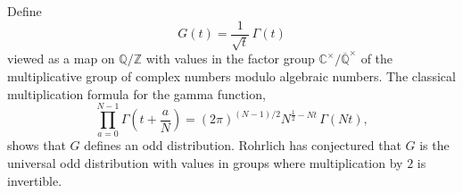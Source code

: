 Define
$$
G(t) = \frac{1}{\sqrt{t}} \, \Gamma(t)
$$
viewed as a map on $\mathbb{Q}/\mathbb{Z}$ with values in the factor group $\mathbb{C}^\times / \overline{\mathbb{Q}}^\times$ of the multiplicative group of complex numbers modulo algebraic numbers. The classical multiplication formula for the gamma function,
$$
\prod_{a=0}^{N-1} \Gamma\!\left(t + \frac{a}{N}\right) = (2\pi)^{(N-1)/2} N^{\frac{1}{2} - Nt} \, \Gamma(Nt),
$$
shows that $G$ defines an odd distribution. Rohrlich has conjectured that $G$ is the universal odd distribution with values in groups where multiplication by $2$ is invertible.
